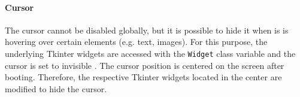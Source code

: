 \paragraph{Cursor}
The cursor cannot be disabled globally, but it is possible to hide it when is is hovering over certain elements (e.g. text, images).
For this purpose, the underlying Tkinter widgets are accessed with the \texttt{Widget} class variable and the cursor is set to invisible \cite{inf_pysimplegui_widget}.
The cursor position is centered on the screen after booting.
Therefore, the respective Tkinter widgets located in the center are modified to hide the cursor.
